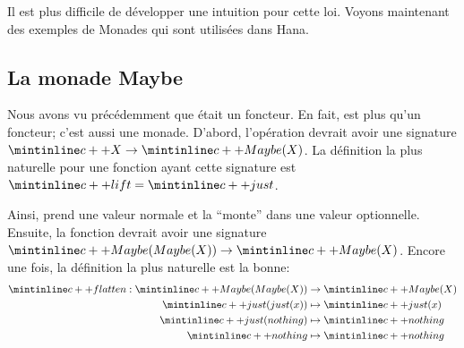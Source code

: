 Il est plus difficile de développer une intuition pour cette loi. Voyons
maintenant des exemples de Monades qui sont utilisées dans Hana.


\subsection{La monade Maybe}
Nous avons vu précédemment que  était un foncteur. En fait,
 est plus qu'un foncteur; c'est aussi une monade. D'abord,
l'opération  devrait avoir une signature $\cc{X} \to \cc{Maybe(X)}$.
La définition la plus naturelle pour une fonction ayant cette signature est
$\cc{lift} = \cc{just}$.

Ainsi,  prend une valeur normale et la ``monte'' dans une valeur
optionnelle. Ensuite, la fonction  devrait avoir une signature
$\cc{Maybe(Maybe(X))} \to \cc{Maybe(X)}$. Encore une fois, la définition la
plus naturelle est la bonne:
\begin{align*}
    \cc{flatten} : \cc{Maybe(Maybe(X))} &\to \cc{Maybe(X)} \\
    \cc{just(just(x))} &\mapsto \cc{just(x)} \\
    \cc{just(nothing)} &\mapsto \cc{nothing} \\
    \cc{nothing} &\mapsto \cc{nothing}
\end{align*}

